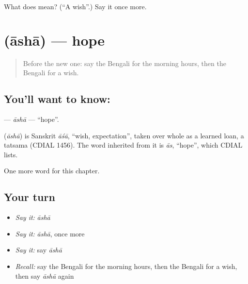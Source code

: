 \begin{tcolorbox}[breakable,colback=teal!4,colframe=teal!35!black,title={Before you move on}]
What does  mean? (\textquotedblleft{}A wish\textquotedblright{}.) Say it once more.
\end{tcolorbox}
\section[\texorpdfstring{\bn{আশা} (āshā)}{আশা (āshā)}]{ (āshā) — hope}

\label{lesson:BN-C96-asha}



\begin{quote}
Before the new one: say the Bengali for the morning hours, then the Bengali for a wish.
\end{quote}

\subsection*{You'll want to know: }
\textbf{} — \emph{āshā} — \textquotedblleft{}hope\textquotedblright{}.

\begin{cousinweb}
\textbf{} (\emph{āshā}) is Sanskrit \emph{āśā}, \textquotedblleft{}wish, expectation\textquotedblright{}, taken over whole as a learned loan, a tatsama (CDIAL 1456). The word inherited from it is \emph{ās}, \textquotedblleft{}hope\textquotedblright{}, which CDIAL lists.
\end{cousinweb}

\begin{grammarlens}[title={What you've built}]
One more word for this chapter.
\end{grammarlens}

\subsection*{Your turn}
\begin{itemize}
\raggedright
  \item \emph{Say it:} \emph{āshā}
  \item \emph{Say it:} \emph{āshā}, once more
  \item \emph{Say it:} say \emph{āshā}
  \item \emph{Recall:} say the Bengali for the morning hours, then the Bengali for a wish, then say \emph{āshā} again
\end{itemize}

